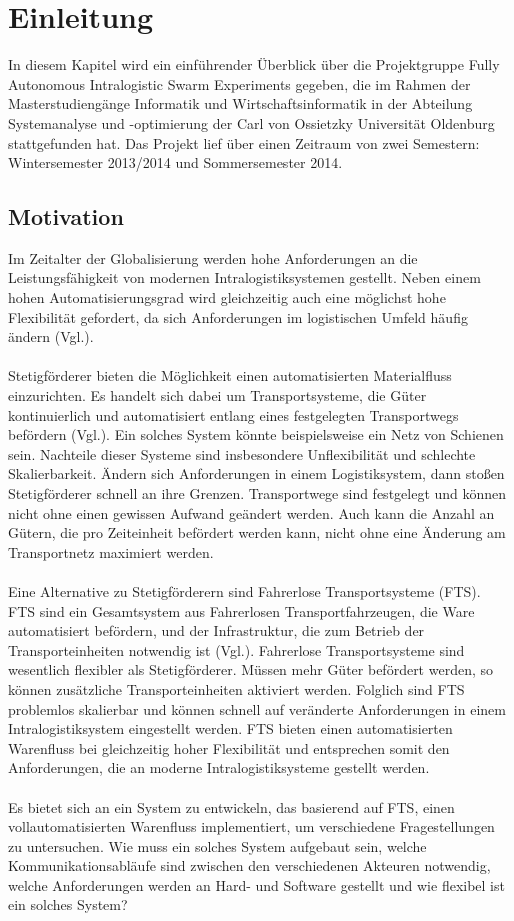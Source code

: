 \section{Einleitung}
In diesem Kapitel wird ein einführender Überblick über die Projektgruppe Fully Autonomous Intralogistic Swarm Experiments gegeben, die im Rahmen der Masterstudiengänge Informatik und Wirtschaftsinformatik in der Abteilung Systemanalyse und -optimierung der Carl von Ossietzky Universität Oldenburg stattgefunden hat. Das Projekt lief über einen Zeitraum von zwei Semestern: Wintersemester 2013/2014 und Sommersemester 2014.


\subsection{Motivation}
Im Zeitalter der Globalisierung werden hohe Anforderungen an die Leistungsfähigkeit von modernen Intralogistiksystemen gestellt. Neben einem hohen Automatisierungsgrad wird gleichzeitig auch eine möglichst hohe Flexibilität gefordert, da sich Anforderungen im logistischen Umfeld häufig ändern (Vgl.\cite{ieft}).    
\\\\
Stetigförderer bieten die Möglichkeit einen automatisierten Materialfluss einzurichten. Es handelt sich dabei um Transportsysteme, die Güter kontinuierlich und automatisiert entlang eines festgelegten Transportwegs befördern (Vgl.\cite{stf}). Ein solches System könnte beispielsweise ein Netz von Schienen sein. Nachteile dieser Systeme sind insbesondere Unflexibilität und schlechte Skalierbarkeit. Ändern sich Anforderungen in einem Logistiksystem, dann stoßen Stetigförderer schnell an ihre Grenzen. Transportwege sind festgelegt und können nicht ohne einen gewissen Aufwand geändert werden. Auch kann die Anzahl an Gütern, die pro Zeiteinheit befördert werden kann, nicht ohne eine Änderung am Transportnetz maximiert werden.
\\\\
Eine Alternative zu Stetigförderern sind Fahrerlose Transportsysteme (FTS). FTS sind ein Gesamtsystem aus Fahrerlosen Transportfahrzeugen, die Ware automatisiert befördern, und der Infrastruktur, die zum Betrieb der Transporteinheiten notwendig ist (Vgl.\cite{fts}). Fahrerlose Transportsysteme sind wesentlich flexibler als Stetigförderer. Müssen mehr Güter befördert werden, so können zusätzliche Transporteinheiten aktiviert werden. Folglich sind FTS problemlos skalierbar und können schnell auf veränderte Anforderungen in einem Intralogistiksystem eingestellt werden. FTS bieten einen automatisierten Warenfluss bei gleichzeitig hoher Flexibilität und entsprechen somit den Anforderungen, die an moderne Intralogistiksysteme gestellt werden.  
\\\\
Es bietet sich an ein System zu entwickeln, das basierend auf FTS, einen vollautomatisierten Warenfluss implementiert, um verschiedene Fragestellungen zu untersuchen. Wie muss ein solches System aufgebaut sein, welche Kommunikationsabläufe sind zwischen den verschiedenen Akteuren notwendig, welche Anforderungen werden an Hard- und Software gestellt und wie flexibel ist ein solches System?  

